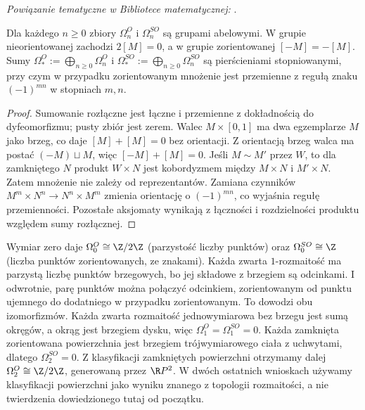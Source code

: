 \noindent\emph{Powiązanie tematyczne w Bibliotece matematycznej:} .

\begin{stwierdzenie}
\label{prop:bordism-group-v9}
Dla każdego $n\ge0$ zbiory $\Omega_n^O$ i
$\Omega_n^{SO}$ są grupami abelowymi. W grupie
nieorientowanej zachodzi $2[M]=0$, a w grupie
zorientowanej $[-M]=-[M]$. Sumy
$\Omega_*^O:=\bigoplus_{n\ge0}\Omega_n^O$
i $\Omega_*^{SO}:=\bigoplus_{n\ge0}\Omega_n^{SO}$
są pierścieniami stopniowanymi, przy czym
w przypadku zorientowanym mnożenie jest
przemienne z regułą znaku $(-1)^{mn}$ w stopniach
$m,n$.
\end{stwierdzenie}
\begin{proof}
Sumowanie rozłączne jest łączne i przemienne z
dokładnością do dyfeomorfizmu; pusty zbiór jest
zerem. Walec $M\times[0,1]$ ma dwa egzemplarze
$M$ jako brzeg, co daje $[M]+[M]=0$ bez orientacji.
Z orientacją brzeg walca ma postać $(-M)\sqcup M$,
więc $[-M]+[M]=0$. Jeśli $M\sim M'$ przez $W$,
to dla zamkniętego $N$ produkt $W\times N$ jest
kobordyzmem między $M\times N$ i $M'\times N$.
Zatem mnożenie nie zależy od reprezentantów.
Zamiana czynników $M^m\times N^n\to N^n\times M^m$
zmienia orientację o $(-1)^{mn}$, co wyjaśnia
regułę przemienności. Pozostałe aksjomaty wynikają
z łączności i rozdzielności produktu względem
sumy rozłącznej.
\end{proof}

\begin{przyklad}
\label{ex:bordism-low-v9}
Wymiar zero daje $\Omega_0^O\cong\Z/2\Z$
(parzystość liczby punktów) oraz
$\Omega_0^{SO}\cong\Z$ (liczba punktów zorientowanych,
ze znakami). Każda zwarta $1$-rozmaitość ma parzystą
liczbę punktów brzegowych, bo jej składowe z brzegiem są
odcinkami. I odwrotnie, parę punktów można połączyć
odcinkiem, zorientowanym od punktu ujemnego do dodatniego
w przypadku zorientowanym. To dowodzi obu izomorfizmów. Każda zwarta rozmaitość jednowymiarowa
bez brzegu jest sumą okręgów, a okrąg jest brzegiem
dysku, więc $\Omega_1^O=\Omega_1^{SO}=0$.
Każda zamknięta zorientowana powierzchnia jest brzegiem
trójwymiarowego ciała z uchwytami, dlatego
$\Omega_2^{SO}=0$. Z klasyfikacji zamkniętych
powierzchni otrzymamy dalej
$\Omega_2^O\cong\Z/2\Z$, generowaną przez
$\R P^2$. W dwóch ostatnich wnioskach używamy
klasyfikacji powierzchni jako wyniku znanego z
topologii rozmaitości, a nie twierdzenia dowiedzionego
tutaj od początku.
\end{przyklad}

